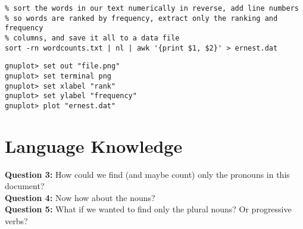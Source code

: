 \documentclass[12pt]{article}
\begin{document}
\begin{verbatim}
% sort the words in our text numerically in reverse, add line numbers
% so words are ranked by frequency, extract only the ranking and frequency
% columns, and save it all to a data file 
sort -rn wordcounts.txt | nl | awk '{print $1, $2}' > ernest.dat
\end{verbatim}

\begin{verbatim}
gnuplot> set out "file.png"
gnuplot> set terminal png
gnuplot> set xlabel "rank"
gnuplot> set ylabel "frequency"
gnuplot> plot "ernest.dat"
\end{verbatim}
\section{Language Knowledge}
\noindent
\textbf{Question 3:} How could we find (and maybe count) only the pronouns in this document?\\
\textbf{Question 4:} Now how about the nouns?\\
\textbf{Question 5:} What if we wanted to find only the plural nouns? Or progressive verbs?\\
\end{document}
